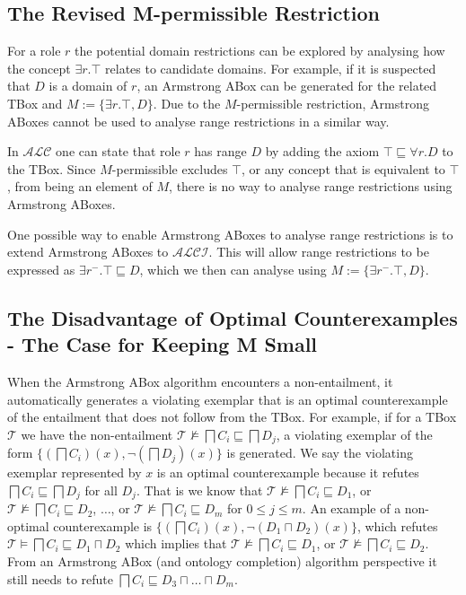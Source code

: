 \documentclass{amsart}
\begin{document}
   \subsection{The Revised M-permissible Restriction} \label{subsec_MPermissibleRestriction} 
   For a role $r$ the potential domain restrictions can be explored by analysing how the concept $\exists r.\top$ relates to candidate domains. For example, if it is suspected that $D$ is a domain of $r$, an Armstrong ABox can be generated for the related TBox and $M := \{\exists r.\top, D\}$. Due to the $M$-permissible restriction, Armstrong ABoxes cannot be used to analyse range restrictions in a similar way.

   In $\mathcal{ALC}$ one can state that role $r$ has range $D$ by adding the axiom $\top \sqsubseteq \forall r. D$ to the TBox. Since $M$-permissible excludes $\top$, or any concept that is equivalent to $\top$, from being an element of $M$, there is no way to analyse range restrictions using Armstrong ABoxes.
   
   One possible way to enable Armstrong ABoxes to analyse range restrictions is to extend Armstrong ABoxes to $\mathcal{ALCI}$. This will allow range restrictions to be expressed as $\exists r^-.\top \sqsubseteq D$, which we then can analyse using $M := \{\exists r^-.\top, D\}$. 
  
  \subsection{The Disadvantage of Optimal Counterexamples - The Case for Keeping M Small} 
  When the Armstrong ABox algorithm encounters a non-entailment, it automatically generates a violating exemplar that is an optimal counterexample of the entailment that does not follow from the TBox. For example, if for a TBox $\mathcal{T}$ we have the non-entailment $\mathcal{T} \nvDash \bigsqcap C_i \sqsubseteq \bigsqcap D_j$, a violating exemplar of the form $\{(\bigsqcap C_i)(x), \neg(\bigsqcap D_j)(x)\}$ is generated. We say the violating exemplar represented by $x$ is an optimal counterexample because it refutes $\bigsqcap C_i \sqsubseteq \bigsqcap D_j$ for all $D_j$. That is we know that $\mathcal{T} \nvDash \bigsqcap C_i \sqsubseteq D_1$, or $\mathcal{T} \nvDash \bigsqcap C_i \sqsubseteq D_2$, $\ldots$, or $\mathcal{T} \nvDash \bigsqcap C_i \sqsubseteq D_m$ for $0 \leq j \leq m$. An example of a non-optimal counterexample is $\{(\bigsqcap C_i)(x), \neg (D_1 \sqcap D_2)(x)\}$, which refutes $\mathcal{T} \vDash \bigsqcap C_i \sqsubseteq  D_1 \sqcap D_2$ which implies that $\mathcal{T} \nvDash \bigsqcap C_i \sqsubseteq D_1$, or $\mathcal{T} \nvDash \bigsqcap C_i \sqsubseteq D_2$. From an Armstrong ABox (and ontology completion) algorithm perspective it still needs to refute $\bigsqcap C_i \sqsubseteq D_3 \sqcap \ldots \sqcap D_m$.
  
\end{document}
